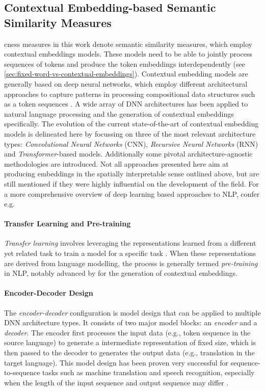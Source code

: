 \documentclass[11pt]{scrreprt}
\let\citef\cite  %
\let\cite\parencite  %
\begin{document}
\subsection{Contextual Embedding-based Semantic Similarity Measures}
\label{sec:contextual-embedding-semantic-similarity}
\gls{cness} measures in this work denote semantic similarity measures, which employ contextual embeddings models. These models need to be able to jointly process sequences of tokens and produce the token embeddings interdependently (see \cref{sec:fixed-word-vs-contextual-embeddings}). Contextual embedding models are generally based on deep neural networks, which employ different architectural approaches to capture patterns in processing compositional data structures such as a token sequences \cite{goodfellowDeepLearning2016}. A wide array of DNN architectures has been applied to natural language processing and the generation of contextual embeddings specifically. The evolution of the current state-of-the-art of contextual embedding models is delineated here by focussing on three of the most relevant architecture types: \textit{Convolutional Neural Networks} (CNN), \textit{Recursive Neural Networks} (RNN) and \textit{Transformer}-based models. Additionally some pivotal architecture-agnostic methodologies are introduced. Not all approaches presented here aim at producing embeddings in the spatially interpretable sense outlined above, but are still mentioned if they were highly influential on the development of the field. For a more comprehensive overview of deep learning based approaches to NLP, confer e.g. \citef{youngRecentTrendsDeep2018, minaeeDeepLearningBased2021, minRecentAdvancesNatural2023}

\paragraph{Transfer Learning and Pre-training} \textit{Transfer learning} involves leveraging the representations learned from a different yet related task to train a model for a specific task \cite{zhuangComprehensiveSurveyTransfer2021}. When these representations are derived from language modelling, the process is generally termed \textit{pre-training} in NLP, notably advanced by \citef{daiSemisupervisedSequenceLearning2015} for the generation of contextual embeddings.

\paragraph{Encoder-Decoder Design}
The \textit{encoder-decoder} configuration is model design that can be applied to multiple DNN architecture types. It consists of two major model blocks: an \textit{encoder} and a \textit{decoder}. The encoder first processes the input data (e.g., token sequence in the source language) to generate a  intermediate representation of fixed size, which is then passed to the decoder to generates the output data (e.g., translation in the target language). This model design has been proven very successful for sequence-to-sequence tasks such as machine translation and speech recognition, especially when the length of the input sequence and output sequence may differ \cite{choPropertiesNeuralMachine2014}.
\end{document}
